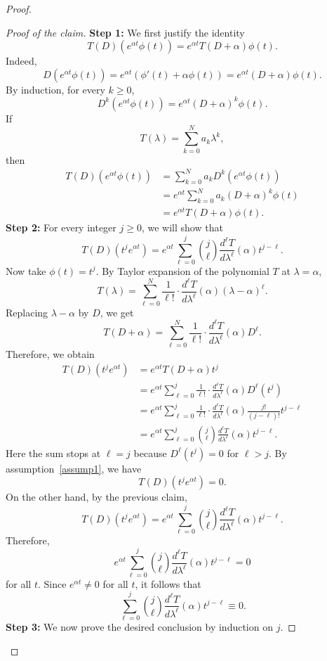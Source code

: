 ﻿\documentclass[12pt]{article}
\begin{document}
\begin{proof}
\begin{proof}[Proof of the claim]
\textbf{Step 1:} We first justify the identity
\[
 T(D)(e^{\alpha t}\phi(t))
 =
 e^{\alpha t}T(D + \alpha)\phi(t).
\]
Indeed,
\[
 D(e^{\alpha t}\phi(t))
 =
 e^{\alpha t}(\phi'(t) + \alpha\phi(t))
 =
 e^{\alpha t}(D + \alpha)\phi(t).
\]
By induction, for every $k\ge0$,
\[
 D^k(e^{\alpha t}\phi(t))
 =
 e^{\alpha t}(D + \alpha)^k\phi(t).
\]
If
\[
 T(\lambda) = \sum_{k = 0}^{N}a_k\lambda^k,
\]
then
\[
\begin{aligned}
 T(D)(e^{\alpha t}\phi(t))
 & =
 \sum_{k = 0}^{N}a_kD^k(e^{\alpha t}\phi(t))\\
 & =
 e^{\alpha t}\sum_{k = 0}^{N}a_k(D + \alpha)^k\phi(t)\\
 & =
 e^{\alpha t}T(D + \alpha)\phi(t).
\end{aligned}
\]
\textbf{Step 2: }For every integer $j\ge 0$, we will show that
\[
 T(D)(t^j e^{\alpha t})
 =
 e^{\alpha t}
 \sum_{\ell = 0}^{j}
 \binom{j}{\ell}
 \frac{d^\ell T}{d\lambda^\ell}(\alpha)
 t^{j - \ell}.
\]
Now take $\phi(t) = t^j$. By Taylor expansion of the polynomial $T$ at $\lambda = \alpha$,
\[
 T(\lambda)
 =
 \sum_{\ell = 0}^{N}
 \frac{1}{\ell!} \cdot \frac{d^\ell T}{d\lambda^\ell}(\alpha)
 (\lambda - \alpha)^\ell.
\]
Replacing $\lambda - \alpha$ by $D$, we get
\[
 T(D + \alpha)
 =
 \sum_{\ell = 0}^{N}
 \frac{1}{\ell!} \cdot \frac{d^\ell T}{d\lambda^\ell}(\alpha)
 D^\ell.
\]
Therefore, we obtain
\[
\begin{aligned}
 T(D)(t^j e^{\alpha t})
 & =
 e^{\alpha t}T(D + \alpha)t^j\\
 & =
 e^{\alpha t}
 \sum_{\ell = 0}^{j}
 \frac{1}{\ell!} \cdot \frac{d^\ell T}{d\lambda^\ell}(\alpha)
 D^\ell(t^j)\\
 & =
 e^{\alpha t}
 \sum_{\ell = 0}^{j}
 \frac{1}{\ell!} \cdot \frac{d^\ell T}{d\lambda^\ell}(\alpha)
 \frac{j!}{(j - \ell)!}t^{j - \ell}\\
 & =
 e^{\alpha t}
 \sum_{\ell = 0}^{j}
 \binom{j}{\ell}
 \frac{d^\ell T}{d\lambda^\ell}(\alpha)
 t^{j - \ell}.
\end{aligned}
\]
Here the sum stops at $\ell = j$ because $D^\ell(t^j) = 0$ for $\ell > j$. By assumption~\eqref{assump1}, we have
\[
 T(D)(t^j e^{\alpha t}) = 0.
\]
On the other hand, by the previous claim,
\[
 T(D)(t^j e^{\alpha t})
 =
 e^{\alpha t}
 \sum_{\ell = 0}^{j}
 \binom{j}{\ell}
 \frac{d^\ell T}{d\lambda^\ell}(\alpha)
 t^{j - \ell}.
\]
Therefore,
\[
 e^{\alpha t}
 \sum_{\ell = 0}^{j}
 \binom{j}{\ell}
 \frac{d^\ell T}{d\lambda^\ell}(\alpha)
 t^{j - \ell}
 =
 0
\]
for all $t$. Since $e^{\alpha t} \neq 0$ for all $t$, it follows that
\[
 \sum_{\ell = 0}^{j}
 \binom{j}{\ell}
 \frac{d^\ell T}{d\lambda^\ell}(\alpha)
 t^{j - \ell}
 \equiv 0.
\]
\textbf{Step 3:} We now prove the desired conclusion by induction on $j$.


\end{proof}
\end{proof}
\end{document}
